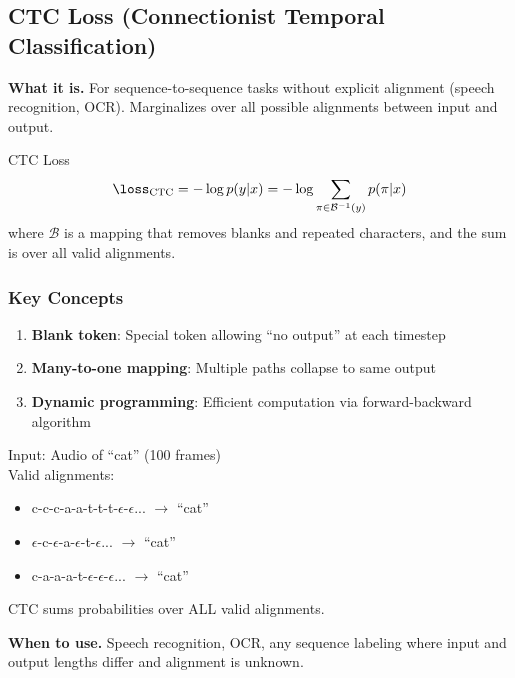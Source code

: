 \subsection{CTC Loss (Connectionist Temporal Classification)}

\textbf{What it is.} For sequence-to-sequence tasks without explicit alignment (speech recognition, OCR). Marginalizes over all possible alignments between input and output.

\begin{mathresult}{CTC Loss}
\begin{equation}
\loss_{\text{CTC}} = -\log p(y | x) = -\log \sum_{\pi \in \mathcal{B}^{-1}(y)} p(\pi | x)
\end{equation}
where $\mathcal{B}$ is a mapping that removes blanks and repeated characters, and the sum is over all valid alignments.
\end{mathresult}

\subsubsection{Key Concepts}

\begin{enumerate}
    \item \textbf{Blank token}: Special token allowing ``no output'' at each timestep
    \item \textbf{Many-to-one mapping}: Multiple paths collapse to same output
    \item \textbf{Dynamic programming}: Efficient computation via forward-backward algorithm
\end{enumerate}

\begin{example}
Input: Audio of ``cat'' (100 frames)\\
Valid alignments:
\begin{itemize}
    \item c-c-c-a-a-t-t-t-$\epsilon$-$\epsilon$... $\to$ ``cat''
    \item $\epsilon$-c-$\epsilon$-a-$\epsilon$-t-$\epsilon$... $\to$ ``cat''
    \item c-a-a-a-t-$\epsilon$-$\epsilon$-$\epsilon$... $\to$ ``cat''
\end{itemize}
CTC sums probabilities over ALL valid alignments.
\end{example}

\textbf{When to use.} Speech recognition, OCR, any sequence labeling where input and output lengths differ and alignment is unknown.

